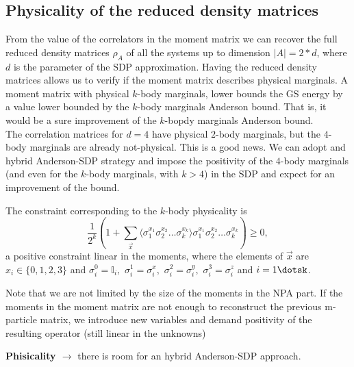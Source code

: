 \documentclass[10pt,a4paper,twoside,twocolumn]{revtex4-1}
\begin{document}
  
\subsection{Physicality of the reduced density matrices}
 From the value of the correlators in the moment matrix we can recover the full reduced density matrices $\rho_A$ of all the systems up to dimension $|A|=2*d$, where $d$ is the parameter of the SDP approximation.
 Having the reduced density matrices allows us to verify if the moment matrix describes physical marginals. A moment matrix with physical $k$-body marginals, lower bounds the GS energy by a value lower bounded by the $k$-body marginals Anderson bound. That is, it would be a sure improvement of the $k$-bopdy marginals Anderson bound.\\
 The correlation matrices for $d=4$ have physical $2$-body marginals, but the $4$-body marginals are already not-physical. This is a good news. We can adopt and hybrid Anderson-SDP strategy and impose the positivity of the $4$-body marginals (and even for the $k$-body marginals, with $k>4$) in the SDP and expect for an improvement of the bound.
 
The constraint corresponding to the $k$-body physicality is
\begin{equation}
\frac{1}{2^k} \left( 1 + \sum_{\vec{x}} \langle \sigma^{x_1}_{1}\sigma^{x_2}_{2}\dots \sigma^{x_k}_{k}\rangle \sigma^{x_1}_{1}\sigma^{x_2}_{2}\dots \sigma^{x_k}_{k}\right) \geq 0 ,
\end{equation}
a positive constraint linear in the moments,  where the elements of $\vec{x}$ are $x_i \in \{0,1,2,3\}$ and $\sigma^{0}_{i}=\mathbb{I}_{i},$ $\sigma^{1}_{i}=\sigma^{x}_{i},$ $\sigma^{2}_{i}=\sigma^{y}_{i},$ $\sigma^{3}_{i}=\sigma^{z}_{i}$ and $i=1\dotsk$.

Note that we are not limited by the size of the moments in the NPA part. If the moments in the moment matrix are not enough to reconstruct the previous m-particle matrix, we introduce new variables and demand positivity of the resulting operator (still linear in the unknowns)

 
 \textbf{Phisicality $\rightarrow$} there is room for an hybrid Anderson-SDP approach. 
 
 
 
\end{document}

